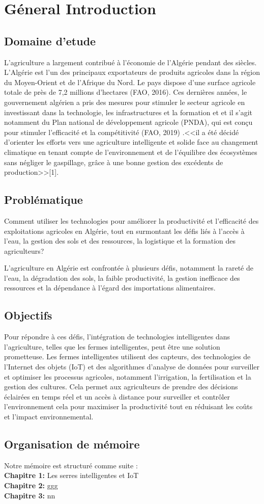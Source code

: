 \chapter*{Géneral Introduction} 
\label{chap:introduction} 


\section*{Domaine d'etude}

L'agriculture a largement contribué à l'économie de l'Algérie pendant des siècles. L'Algérie est l'un des principaux exportateurs de produits agricoles dans la région du Moyen-Orient et de l'Afrique du Nord. Le pays dispose d'une surface agricole totale de près de 7,2 millions d'hectares  (FAO, 2016).
Ces dernières années, le gouvernement algérien a pris des mesures pour stimuler le secteur agricole en investissant dans la technologie, les infrastructures et la formation et et il s'agit notamment du Plan national de développement agricole (PNDA), qui est conçu pour stimuler l'efficacité et la compétitivité (FAO, 2019) .<<il a été décidé d’orienter les efforts vers une agriculture intelligente et solide face au changement climatique en tenant compte de l’environnement et de l’équilibre des écosystèmes sans négliger le gaspillage, grâce à une bonne gestion des excédents de production>>[1].


\section*{Problématique }
Comment utiliser les technologies pour améliorer la productivité et l'efficacité des exploitations agricoles en Algérie, tout en surmontant les défis liés à l'accès à l'eau, la gestion des sols et des ressources, la logistique et la formation des agriculteurs?

L'agriculture en Algérie est confrontée à plusieurs défis, notamment la rareté de l'eau, la dégradation des sols, la faible productivité, la gestion inefficace des ressources et la dépendance à l'égard des importations alimentaires. 

\section*{Objectifs }
Pour répondre à ces défis, l'intégration de technologies intelligentes dans l'agriculture, telles que les fermes intelligentes, peut être une solution prometteuse. Les fermes intelligentes utilisent des capteurs, des technologies de l'Internet des objets (IoT) et des algorithmes d'analyse de données pour surveiller et optimiser les processus agricoles, notamment l'irrigation, la fertilisation et la gestion des cultures. Cela permet aux agriculteurs de prendre des décisions éclairées en temps réel et un accès à distance pour surveiller et contrôler l’environnement cela pour maximiser la productivité tout en réduisant les coûts et l'impact environnemental.


\section*{Organisation de mémoire }
Notre mémoire est structuré comme suite : 
\\
\textbf{Chapitre 1: }
Les serres intelligentes et IoT
\\
\textbf{Chapitre 2: }
ggg
\\
\textbf{Chapitre 3: }
nn